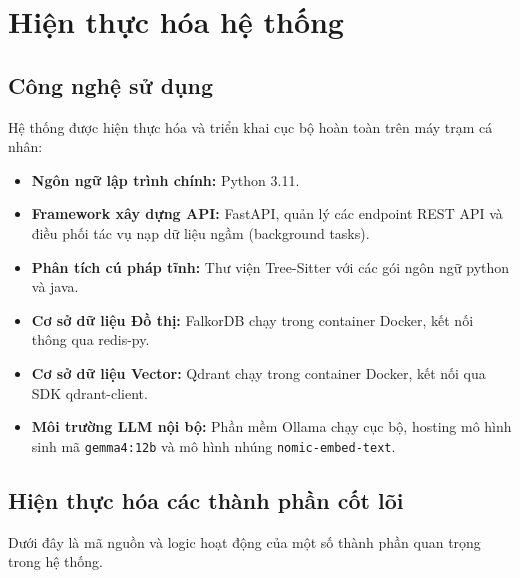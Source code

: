 \documentclass[12pt,a4paper,oneside]{report}
\begin{document}
\chapter{Hiện thực hóa hệ thống}

\section{Công nghệ sử dụng}
Hệ thống được hiện thực hóa và triển khai cục bộ hoàn toàn trên máy trạm cá nhân:
\begin{itemize}
    \item \textbf{Ngôn ngữ lập trình chính:} Python 3.11.
    \item \textbf{Framework xây dựng API:} FastAPI, quản lý các endpoint REST API và điều phối tác vụ nạp dữ liệu ngầm (background tasks).
    \item \textbf{Phân tích cú pháp tĩnh:} Thư viện Tree-Sitter với các gói ngôn ngữ python và java.
    \item \textbf{Cơ sở dữ liệu Đồ thị:} FalkorDB chạy trong container Docker, kết nối thông qua redis-py.
    \item \textbf{Cơ sở dữ liệu Vector:} Qdrant chạy trong container Docker, kết nối qua SDK qdrant-client.
    \item \textbf{Môi trường LLM nội bộ:} Phần mềm Ollama chạy cục bộ, hosting mô hình sinh mã \texttt{gemma4:12b} và mô hình nhúng \texttt{nomic-embed-text}.
\end{itemize}

\section{Hiện thực hóa các thành phần cốt lõi}
Dưới đây là mã nguồn và logic hoạt động của một số thành phần quan trọng trong hệ thống.
\end{document}
